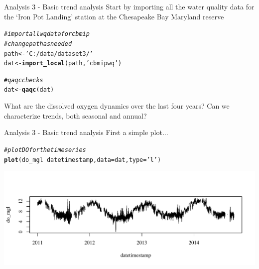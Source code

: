 \documentclass[xcolor=svgnames]{beamer}\usepackage[]{graphicx}\usepackage[]{color}
\makeatletter
\newcommand{\hlstr}[1]{\textcolor[rgb]{0.192,0.494,0.8}{#1}}%
\newcommand{\hlcom}[1]{\textcolor[rgb]{0.678,0.584,0.686}{\textit{#1}}}%
\newcommand{\hlopt}[1]{\textcolor[rgb]{0,0,0}{#1}}%
\newcommand{\hlstd}[1]{\textcolor[rgb]{0.345,0.345,0.345}{#1}}%
\newcommand{\hlkwb}[1]{\textcolor[rgb]{0.69,0.353,0.396}{#1}}%
\newcommand{\hlkwc}[1]{\textcolor[rgb]{0.333,0.667,0.333}{#1}}%
\newcommand{\hlkwd}[1]{\textcolor[rgb]{0.737,0.353,0.396}{\textbf{#1}}}%
\newenvironment{kframe}{%
 \def\at@end@of@kframe{}%
 \ifinner\ifhmode%
  \def\at@end@of@kframe{\end{minipage}}%
  \begin{minipage}{\columnwidth}%
 \fi\fi%
 \def\FrameCommand##1{\hskip\@totalleftmargin \hskip-\fboxsep
 \colorbox{shadecolor}{##1}\hskip-\fboxsep
     \hskip-\linewidth \hskip-\@totalleftmargin \hskip\columnwidth}%
 \MakeFramed {\advance\hsize-\width
   \@totalleftmargin\z@ \linewidth\hsize
   \@setminipage}}%
 {\par\unskip\endMakeFramed%
 \at@end@of@kframe}
\newenvironment{knitrout}{}{} %
\makeatother
\begin{document}
\begin{frame}[containsverbatim]{Analysis 3 - Basic trend analysis}
Start by importing all the water quality data for the `Iron Pot Landing' station at the Chesapeake Bay Maryland reserve 

\begin{knitrout}\scriptsize
{}\color{fgcolor}\begin{kframe}
\begin{alltt}
\hlcom{# import all wq data for cbmip}
\hlcom{# change path as needed}
\hlstd{path} \hlkwb{<-} \hlstr{'C:/data/dataset3/'}
\hlstd{dat} \hlkwb{<-} \hlkwd{import_local}\hlstd{(path,} \hlstr{'cbmipwq'}\hlstd{)}

\hlcom{# qaqc checks}
\hlstd{dat} \hlkwb{<-} \hlkwd{qaqc}\hlstd{(dat)}
\end{alltt}
\end{kframe}
\end{knitrout}
What are the dissolved oxygen dynamics over the last four years?  Can we characterize trends, both seasonal and annual?
\end{frame}

\begin{frame}[containsverbatim]{Analysis 3 - Basic trend analysis}
First a simple plot...
\begin{knitrout}\scriptsize
{}\color{fgcolor}\begin{kframe}
\begin{alltt}
\hlcom{# plot DO for the time series}
\hlkwd{plot}\hlstd{(do_mgl} \hlopt{~} \hlstd{datetimestamp,} \hlkwc{data} \hlstd{= dat,} \hlkwc{type} \hlstd{=} \hlstr{'l'}\hlstd{)}
\end{alltt}
\end{kframe}

{\centering \includegraphics[width=\textwidth]{figure/unnamed-chunk-17} 

}



\end{knitrout}
\end{frame}
\end{document}
